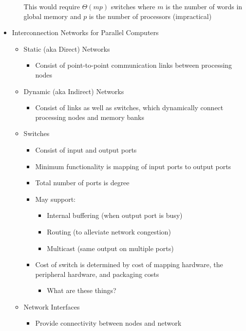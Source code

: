 \documentclass[a4paper]{article}
\begin{document}
\begin{itemize}
\begin{itemize}
        This would require $\Theta(mp)$ switches where $m$ is the number of words in global memory and $p$ is the number of processors (impractical)
    \end{itemize}
  \item Interconnection Networks for Parallel Computers
    \begin{itemize}
      \item Static (aka Direct) Networks
        \begin{itemize}
          \item Consist of point-to-point communication links between processing nodes
        \end{itemize}
      \item Dynamic (aka Indirect) Networks
        \begin{itemize}
          \item Consist of links as well as switches, which dynamically connect processing nodes and memory banks
        \end{itemize}
      \item Switches
        \begin{itemize}
          \item Consist of input and output ports
          \item Minimum functionality is mapping of input ports to output ports
          \item Total number of ports is degree
          \item May support:
            \begin{itemize}
              \item Internal buffering (when output port is busy)
              \item Routing (to alleviate network congestion)
              \item Multicast (same output on multiple ports)
            \end{itemize}
          \item Cost of switch is determined by cost of mapping hardware, the peripheral hardware, and packaging costs
            \begin{itemize}
              \item \color{red} What are these things?
            \end{itemize}
        \end{itemize}
      \item Network Interfaces
        \begin{itemize}
          \item Provide connectivity between nodes and network

\end{itemize}
\end{itemize}
\end{itemize}
\end{document}
